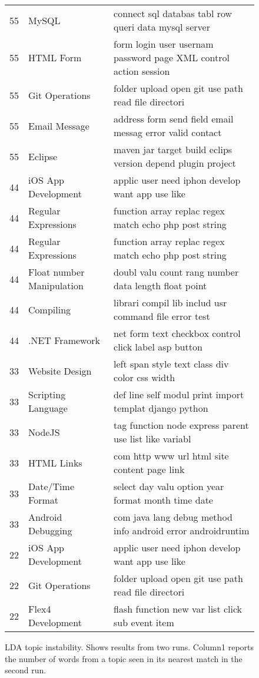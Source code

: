 \begin{figure*}[!t]
\begin{center}
\begin{tabular}{r|l|l}
55 &MySQL & connect sql databas tabl row queri data mysql server\\
55 &HTML Form & form login user usernam password page XML control action session\\
55 &Git Operations & folder upload open git use path read file directori\\
55 &Email Message & address form send field email messag error valid contact\\
55 &Eclipse & maven jar target build eclips version depend plugin project\\
44 &iOS App Development & applic user need iphon develop want app use like\\
44 &Regular Expressions & function array replac regex match echo php post string\\
44 &Regular Expressions & function array replac regex match echo php post string\\
44 &Float number Manipulation & doubl valu count rang number data length float point\\
44 &Compiling & librari compil lib includ usr command file error test\\
44 &.NET Framework & net form text checkbox control click label asp button\\
33 &Website Design & left span style text class div color css width\\
33 &Scripting Language & def line self modul print import templat django python\\
33 &NodeJS & tag function node express parent use list like variabl\\
33 &HTML Links & com http www url html site content page link\\
33 &Date/Time Format & select day valu option year format month time date\\
33 &Android Debugging & com java lang debug method info android error androidruntim\\
22 &iOS App Development & applic user need iphon develop want app use like\\
22 &Git Operations & folder upload open git use path read file directori\\
22 &Flex4 Development & flash function new var list click sub event item
\end{tabular}
\end{center}
\caption{LDA topic instability. Shows results from two runs. Column1 reports the number
of words from a topic seen in its nearest match in the second run.}\label{fig:olap}
\end{figure*}

